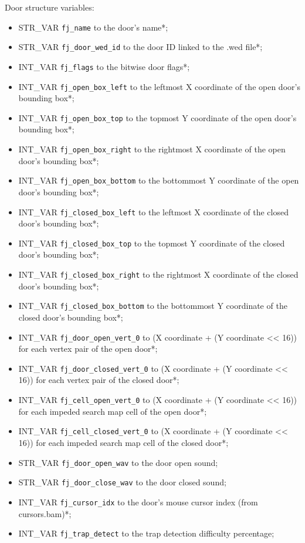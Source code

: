 \documentclass{article}
\begin{document}
Door structure variables:
\begin{itemize}
\item STR_VAR \verb+fj_name+ to the door's name*;
\item STR_VAR \verb+fj_door_wed_id+ to the door ID linked to the .wed file*;
\item INT_VAR \verb+fj_flags+ to the bitwise door flags*;
\item INT_VAR \verb+fj_open_box_left+ to the leftmost X coordinate of the open door's bounding box*;
\item INT_VAR \verb+fj_open_box_top+ to the topmost Y coordinate of the open door's bounding box*;
\item INT_VAR \verb+fj_open_box_right+ to the rightmost X coordinate of the open door's bounding box*;
\item INT_VAR \verb+fj_open_box_bottom+ to the bottommost Y coordinate of the open door's bounding box*;
\item INT_VAR \verb+fj_closed_box_left+ to the leftmost X coordinate of the closed door's bounding box*;
\item INT_VAR \verb+fj_closed_box_top+ to the topmost Y coordinate of the closed door's bounding box*;
\item INT_VAR \verb+fj_closed_box_right+ to the rightmost X coordinate of the closed door's bounding box*;
\item INT_VAR \verb+fj_closed_box_bottom+ to the bottommost Y coordinate of the closed door's bounding box*;
\item INT_VAR \verb+fj_door_open_vert_0+ to (X coordinate + (Y coordinate << 16)) for each vertex pair of the open door*;
\item INT_VAR \verb+fj_door_closed_vert_0+ to (X coordinate + (Y coordinate << 16)) for each vertex pair of the closed door*;
\item INT_VAR \verb+fj_cell_open_vert_0+ to (X coordinate + (Y coordinate << 16)) for each impeded search map cell of the open door*;
\item INT_VAR \verb+fj_cell_closed_vert_0+ to (X coordinate + (Y coordinate << 16)) for each impeded search map cell of the closed door*;
\item STR_VAR \verb+fj_door_open_wav+ to the door open sound;
\item STR_VAR \verb+fj_door_close_wav+ to the door closed sound;
\item INT_VAR \verb+fj_cursor_idx+ to the door's mouse cursor index (from cursors.bam)*;
\item INT_VAR \verb+fj_trap_detect+ to the trap detection difficulty percentage;

\end{itemize}
\end{document}
